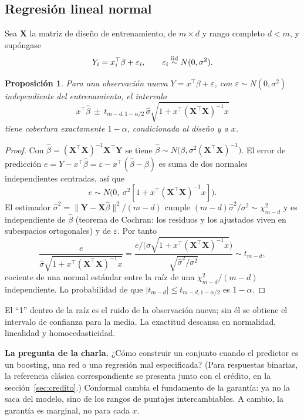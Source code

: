 \documentclass[11pt]{article}
\theoremstyle{plain}
\newtheorem{proposicion}[teorema]{Proposición}
\theoremstyle{definition}
\theoremstyle{remark}
\newcommand{\dest}[1]{\par\needspace{4\baselineskip}\textbf{#1}\quad}
\begin{document}
\subsection{Regresión lineal normal}
Sea $\mathbf X$ la matriz de diseño de entrenamiento, de $m\times d$ y rango completo $d<m$, y
supóngase
\[
 Y_i=x_i^\top\beta+\varepsilon_i,\qquad \varepsilon_i\overset{\rm iid}{\sim}N(0,\sigma^2).
\]
\begin{proposicion}
Para una observación nueva $Y=x^\top\beta+\varepsilon$, con $\varepsilon\sim N(0,\sigma^2)$
independiente del entrenamiento, el intervalo
\[
 x^\top\widehat\beta\ \pm\ t_{m-d,1-\alpha/2}\,\widehat\sigma\sqrt{1+x^\top(\mathbf X^\top\mathbf X)^{-1}x}
\]
tiene cobertura exactamente $1-\alpha$, condicionada al diseño y a $x$.
\end{proposicion}
\begin{proof}
Con $\widehat\beta=(\mathbf X^\top\mathbf X)^{-1}\mathbf X^\top\mathbf Y$ se tiene
$\widehat\beta\sim N\bigl(\beta,\sigma^2(\mathbf X^\top\mathbf X)^{-1}\bigr)$. El error de predicción
$e=Y-x^\top\widehat\beta=\varepsilon-x^\top(\widehat\beta-\beta)$ es suma de dos normales
independientes centradas, así que
\[
 e\sim N\bigl(0,\ \sigma^2[1+x^\top(\mathbf X^\top\mathbf X)^{-1}x]\bigr).
\]
El estimador $\widehat\sigma^2=\|\mathbf Y-\mathbf X\widehat\beta\|^2/(m-d)$ cumple
$(m-d)\widehat\sigma^2/\sigma^2\sim\chi^2_{m-d}$ y es independiente de $\widehat\beta$ (teorema de
Cochran: los residuos y los ajustados viven en subespacios ortogonales) y de $\varepsilon$. Por tanto
\[
 \frac{e}{\widehat\sigma\sqrt{1+x^\top(\mathbf X^\top\mathbf X)^{-1}x}}
 =\frac{e/\bigl(\sigma\sqrt{1+x^\top(\mathbf X^\top\mathbf X)^{-1}x}\bigr)}{\sqrt{\widehat\sigma^2/\sigma^2}}
 \sim t_{m-d},
\]
cociente de una normal estándar entre la raíz de una $\chi^2_{m-d}/(m-d)$ independiente. La
probabilidad de que $|t_{m-d}|\le t_{m-d,1-\alpha/2}$ es $1-\alpha$.
\end{proof}
El ``1'' dentro de la raíz es el ruido de la observación nueva; sin él se obtiene el intervalo de
confianza para la media. La exactitud descansa en normalidad, linealidad y homocedasticidad.

\dest{La pregunta de la charla.} ¿Cómo construir un conjunto cuando el predictor es un boosting,
una red o una regresión mal especificada? (Para respuestas binarias, la referencia clásica correspondiente se
presenta junto con el crédito, en la sección~\ref{sec:credito}.) Conformal cambia el fundamento de la garantía: ya no la
saca del modelo, sino de los rangos de puntajes intercambiables. A cambio, la garantía es
marginal, no para cada $x$.
\end{document}
